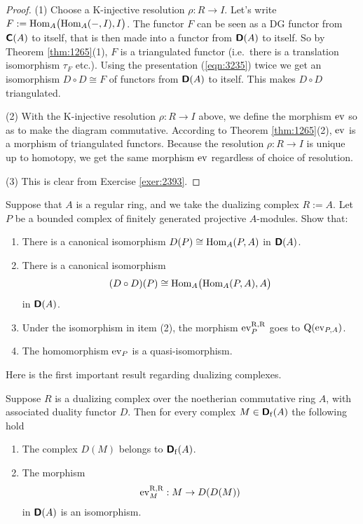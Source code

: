 \begin{proof}
(1) Choose a K-injective resolution $\rho : R \to I$. 
Let's write 
$F := \lb \opn{Hom}_A \bigl( \opn{Hom}_A (-, I), I \bigr)$.
The functor $F$ can be seen as a DG functor from $\boldsymbol{\mathsf{C}}(A)$ to itself, that 
is then made into a functor from $\boldsymbol{\mathsf{D}}(A)$ to itself. So by Theorem 
\ref{thm:1265}(1), $F$ is a triangulated functor (i.e.\ there is a 
translation isomorphism $\tau_F$ etc.). Using the presentation 
(\ref{eqn:3235}) twice we get an isomorphism
$D \circ D \cong  F$  of functors from $\boldsymbol{\mathsf{D}}(A)$ to itself. This makes 
$D \circ D$ triangulated. 

\medskip \noindent 
(2) With the K-injective resolution $\rho : R \to I$ above, we define 
the morphism $\operatorname{ev}$ so as to make the diagram commutative. According to
Theorem \ref{thm:1265}(2), $\operatorname{ev}$ is a morphism of triangulated functors. 
Because the resolution $\rho : R \to I$ is unique up to homotopy, 
we get the same morphism $\operatorname{ev}$ regardless of choice of resolution. 

\medskip \noindent 
(3) This is clear from Exercise \ref{exer:2393}. 
\end{proof}

\begin{exer} \label{exer:3245}
Suppose that $A$ is a regular ring, and we take the dualizing complex $R := A$. 
Let $P$ be a bounded complex of finitely generated projective $A$-modules. 
Show that:
\begin{enumerate}
\item There is a canonical isomorphism 
$D(P) \cong \operatorname{Hom}_{A}(P, A)$ 
in $\boldsymbol{\mathsf{D}}(A)$. 

\item There is a canonical isomorphism 
\[ (D \circ D)(P) \cong \operatorname{Hom}_{A} \bigl( \operatorname{Hom}_{A}(P, A), A \bigr) \]
in $\boldsymbol{\mathsf{D}}(A)$.

\item Under the isomorphism in item (2), the morphism 
$\operatorname{ev}^{\mathrm{R, R}}_{P}$ goes to 
$\operatorname{Q}(\operatorname{ev}_{P, A})$. 

\item The homomorphism $\operatorname{ev}_P$ is a quasi-isomorphism. 
\end{enumerate}
\end{exer}

Here is the first important result regarding dualizing complexes. 

\begin{thm} \label{thm:2155}
Suppose $R$ is a dualizing complex over the noetherian commutative ring $A$, 
with associated duality functor $D$. Then for every complex 
$M \in \boldsymbol{\mathsf{D}}_{\mathrm{f}}(A)$ the following hold\tup{:}
\begin{enumerate}
\item The complex $D(M)$ belongs to $\boldsymbol{\mathsf{D}}_{\mathrm{f}}(A)$. 

\item The morphism 
\[ \operatorname{ev}^{\mathrm{R, R}}_M : M \to D(D(M)) \]
in $\boldsymbol{\mathsf{D}}(A)$ is an isomorphism. 
\end{enumerate}
\end{thm}

